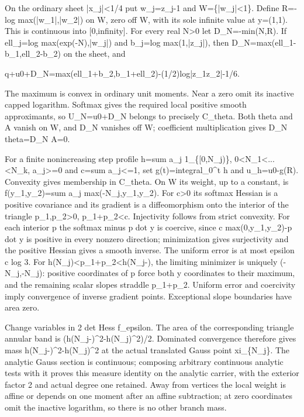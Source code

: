 \documentclass[11pt]{article}
\begin{document}
On the ordinary sheet |x\_j|<1/4 put w\_j=z\_j-1 and W=\{|w\_j|<1\}. Define R=-log max(|w\_1|,|w\_2|) on W, zero off W, with its sole infinite value at y=(1,1). This is continuous into [0,infinity]. For every real N>0 let D\_N=-min(N,R). If ell\_j=log max(exp(-N),|w\_j|) and b\_j=log max(1,|z\_j|), then D\_N=max(ell\_1-b\_1,ell\_2-b\_2) on the sheet, and

q+u0+D\_N=max(ell\_1+b\_2,b\_1+ell\_2)-(1/2)log|z\_1z\_2|-1/6.

The maximum is convex in ordinary unit moments. Near a zero omit its inactive capped logarithm. Softmax gives the required local positive smooth approximants, so U\_N=u0+D\_N belongs to precisely C\_theta. Both theta and A vanish on W, and D\_N vanishes off W; coefficient multiplication gives D\_N theta=D\_N A=0.

For a finite nonincreasing step profile h=sum a\_j 1\_\{[0,N\_j)\}, 0<N\_1<...<N\_k, a\_j>=0 and c=sum a\_j<=1, set g(t)=integral\_0\textasciicircum{}t h and u\_h=u0-g(R). Convexity gives membership in C\_theta. On W its weight, up to a constant, is f(y\_1,y\_2)=sum a\_j max(-N\_j,y\_1,y\_2). For c>0 its softmax Hessian is a positive covariance and its gradient is a diffeomorphism onto the interior of the triangle p\_1,p\_2>0, p\_1+p\_2<c. Injectivity follows from strict convexity. For each interior p the softmax minus p dot y is coercive, since c max(0,y\_1,y\_2)-p dot y is positive in every nonzero direction; minimization gives surjectivity and the positive Hessian gives a smooth inverse. The uniform error is at most epsilon c log 3. For h(N\_j)<p\_1+p\_2<h(N\_j-), the limiting minimizer is uniquely (-N\_j,-N\_j): positive coordinates of p force both y coordinates to their maximum, and the remaining scalar slopes straddle p\_1+p\_2. Uniform error and coercivity imply convergence of inverse gradient points. Exceptional slope boundaries have area zero.

Change variables in 2 det Hess f\_epsilon. The area of the corresponding triangle annular band is (h(N\_j-)\textasciicircum{}2-h(N\_j)\textasciicircum{}2)/2. Dominated convergence therefore gives mass h(N\_j-)\textasciicircum{}2-h(N\_j)\textasciicircum{}2 at the actual translated Gauss point xi\_\{N\_j\}. The analytic Gauss section is continuous; composing arbitrary continuous analytic tests with it proves this measure identity on the analytic carrier, with the exterior factor 2 and actual degree one retained. Away from vertices the local weight is affine or depends on one moment after an affine subtraction; at zero coordinates omit the inactive logarithm, so there is no other branch mass.
\end{document}
